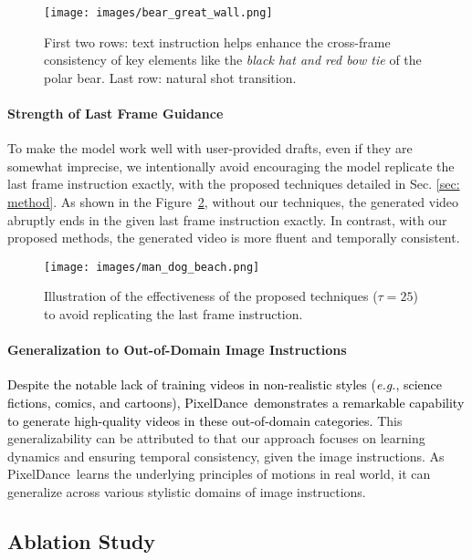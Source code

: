 \documentclass[10pt,twocolumn,letterpaper]{article}
\newcommand{\tcb}{\textcolor{black}}
\newcommand{\ours}{{PixelDance}}
\begin{document}
\begin{figure}[t]
  \centering
  \texttt{[image: images/bear\_great\_wall.png]}
  \caption{
  First two rows: text instruction helps enhance the cross-frame consistency of key elements like the \textit{black hat and red bow tie} of the polar bear. Last row: natural shot transition. 
  }
  \label{fig: bear_great_wall}
\end{figure}




\paragraph{Strength of Last Frame Guidance}
To make the model work well with user-provided drafts, even if they are somewhat imprecise, we intentionally avoid encouraging the model replicate the last frame instruction exactly, with the proposed techniques detailed in Sec. \ref{sec: method}. As shown in the Figure~\ref{fig: man_dog_beach}, without our techniques, the generated video abruptly ends in the given last frame instruction exactly. In contrast, with our proposed methods, the generated video is more fluent and temporally consistent. 


\begin{figure}[t]
  \centering
  \texttt{[image: images/man\_dog\_beach.png]}
  \caption{
  Illustration of the effectiveness of the proposed techniques ($\tau=25$) to avoid replicating the last frame instruction. 
  }
  \label{fig: man_dog_beach}
\end{figure}


\paragraph{Generalization to Out-of-Domain Image Instructions} 
\tcb{Despite the notable lack of training videos in non-realistic styles (\textit{e.g.}, science fictions, comics, and cartoons), \ours~demonstrates a remarkable capability to generate high-quality videos in these out-of-domain categories.} This generalizability can be attributed to that our approach focuses on learning dynamics and ensuring temporal consistency, given the image instructions. As \ours~learns the underlying principles of motions in real world, it can generalize across various stylistic domains of image instructions. 



\subsection{Ablation Study}
\label{sec: ab}
\end{document}
